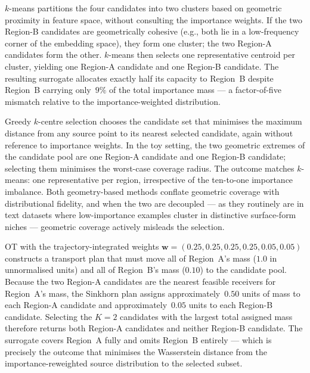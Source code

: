 \begin{foldable}
  $k$-means partitions the four candidates into two clusters based on geometric proximity in feature space, without consulting the importance weights.
  If the two Region-B candidates are geometrically cohesive (e.g., both lie in a low-frequency corner of the embedding space), they form one cluster; the two Region-A candidates form the other.
  $k$-means then selects one representative centroid per cluster, yielding one Region-A candidate and one Region-B candidate.
  The resulting surrogate allocates exactly half its capacity to Region~B despite Region~B carrying only~$9\%$ of the total importance mass --- a factor-of-five mismatch relative to the importance-weighted distribution.
\end{foldable}

\begin{foldable}
  Greedy $k$-centre selection chooses the candidate set that minimises the maximum distance from any source point to its nearest selected candidate, again without reference to importance weights.
  In the toy setting, the two geometric extremes of the candidate pool are one Region-A candidate and one Region-B candidate; selecting them minimises the worst-case coverage radius.
  The outcome matches $k$-means: one representative per region, irrespective of the ten-to-one importance imbalance.
  Both geometry-based methods conflate geometric coverage with distributional fidelity, and when the two are decoupled --- as they routinely are in text datasets where low-importance examples cluster in distinctive surface-form niches --- geometric coverage actively misleads the selection.
\end{foldable}

\begin{foldable}
  \ac{OT} with the trajectory-integrated weights $\mathbf{w} = (0.25, 0.25, 0.25, 0.25, 0.05, 0.05)$ constructs a transport plan that must move all of Region~A's mass ($1.0$ in unnormalised units) and all of Region~B's mass ($0.10$) to the candidate pool.
  Because the two Region-A candidates are the nearest feasible receivers for Region~A's mass, the Sinkhorn plan assigns approximately~$0.50$ units of mass to each Region-A candidate and approximately~$0.05$ units to each Region-B candidate.
  Selecting the $K = 2$ candidates with the largest total assigned mass therefore returns both
  Region-A candidates and neither Region-B candidate.
  The surrogate covers Region~A fully and omits Region~B entirely --- which is precisely the outcome that minimises the Wasserstein distance from the importance-reweighted source distribution to the selected subset.
\end{foldable}

